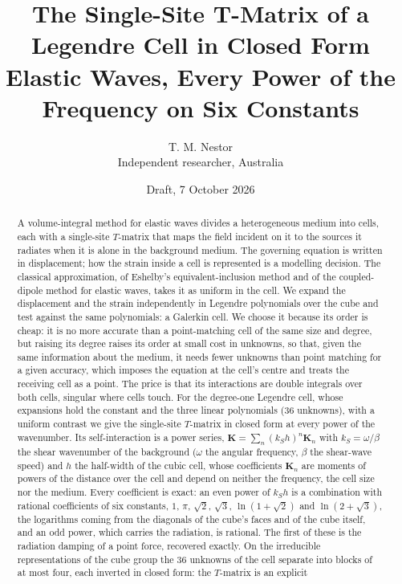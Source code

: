 \documentclass[11pt,a4paper]{article}
\title{\bfseries The Single-Site T-Matrix of a Legendre Cell in Closed Form\\[4pt]
\large Elastic Waves, Every Power of the Frequency on Six Constants}
\author{T. M. Nestor\\[2pt]\small Independent researcher, Australia}
\date{Draft, 7 October 2026}
\begin{document}
\maketitle

\begin{abstract}
\noindent
A volume-integral method for elastic waves divides a heterogeneous medium into cells, each with a
single-site $T$-matrix that maps the field incident on it to the sources it radiates when it is alone in the background medium. The governing
equation is written in displacement; how the strain inside a cell is represented is a modelling
decision. The classical approximation, of Eshelby's equivalent-inclusion method and of the coupled-dipole
method for elastic waves, takes it as uniform in the cell. We expand the displacement and the strain
independently in Legendre polynomials over the cube and test against the same polynomials: a Galerkin
cell. We choose it because its order is cheap: it is no more accurate than a point-matching cell of the same
size and degree, but raising its degree raises its order at small cost in unknowns, so that, given
the same information about the medium, it needs fewer unknowns than point matching for a given accuracy,
which imposes the equation at the cell's centre and
treats the receiving cell as a point. The price is that its interactions are double integrals over both
cells, singular where cells touch. For the degree-one Legendre cell, whose expansions hold the constant and the three linear
polynomials ($36$ unknowns), with a uniform contrast we give the single-site
$T$-matrix in closed form at every power of the wavenumber. Its self-interaction is a power series,
$\mathbf K=\sum_n(k_Sh)^n\mathbf K_n$ with $k_S=\omega/\beta$ the shear wavenumber of the background ($\omega$ the angular frequency, $\beta$ the shear-wave speed) and $h$ the half-width of the cubic cell, whose coefficients $\mathbf K_n$ are moments of
powers of the distance over the cell and depend on neither the frequency, the cell size nor the medium.
Every coefficient is exact: an even power of $k_Sh$ is a combination with rational coefficients of six constants,
$1$, $\pi$, $\sqrt2$, $\sqrt3$, $\ln(1+\sqrt2)$ and $\ln(2+\sqrt3)$, the logarithms coming from the
diagonals of the cube's faces and of the cube itself, and an odd power,
which carries the radiation, is rational. The first of these is the radiation damping of a point force,
recovered exactly. On the irreducible representations of the cube group the $36$ unknowns of the cell
separate into blocks of at most four, each inverted in closed form: the $T$-matrix is an explicit

\end{abstract}
\end{document}
